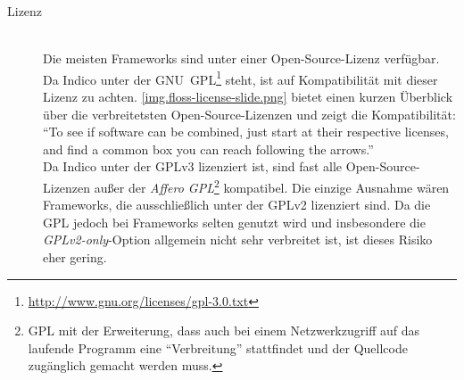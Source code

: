 \begin{description}
\item[Lizenz] \hfill \\
Die meisten Frameworks sind unter einer Open-Source-Lizenz verfügbar.
Da Indico unter der
GNU~GPL\footnote{\href{http://www.gnu.org/licenses/gpl-3.0.txt}{http://www.gnu.org/licenses/gpl-3.0.txt}}
steht, ist auf Kompatibilität mit dieser Lizenz zu achten. \autoref{img.floss-license-slide.png}
bietet einen kurzen Überblick über die verbreitetsten Open-Source-Lizenzen und zeigt die
Kompatibilität: \enquote{To see if software can be combined, just start at their respective
licenses, and find a common box you can reach following the arrows.} \citep{osslic} \\
Da Indico unter der GPLv3 lizenziert ist, sind fast alle Open-Source-Lizenzen außer der \emph{Affero
GPL}\footnote{GPL mit der Erweiterung, dass auch bei einem Netzwerkzugriff auf das laufende Programm
eine \enquote{Verbreitung} stattfindet und der Quellcode zugänglich gemacht werden muss.}
kompatibel. Die einzige Ausnahme wären Frameworks, die ausschließlich unter der GPLv2 lizenziert
sind. Da die GPL jedoch bei Frameworks selten genutzt wird und insbesondere die
\emph{GPLv2-only}-Option allgemein nicht sehr verbreitet ist, ist dieses Risiko eher gering.
\end{description}





